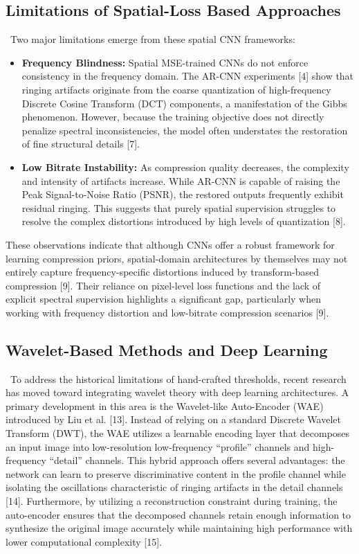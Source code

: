 \documentclass[12pt]{article}
\begin{document}
\subsection*{Limitations of Spatial-Loss Based Approaches}

\quad \, Two major limitations emerge from these spatial CNN frameworks:

\begin{itemize}
    \item \textbf{Frequency Blindness:} Spatial MSE-trained CNNs do not enforce consistency in the frequency domain. The AR-CNN experiments [4] show that ringing artifacts originate from the coarse quantization of high-frequency Discrete Cosine Transform (DCT) components, a manifestation of the Gibbs phenomenon. However, because the training objective does not directly penalize spectral inconsistencies, the model often understates the restoration of fine structural details [7].
    
    \item \textbf{Low Bitrate Instability:} As compression quality decreases, the complexity and intensity of artifacts increase. While AR-CNN is capable of raising the Peak Signal-to-Noise Ratio (PSNR), the restored outputs frequently exhibit residual ringing. This suggests that purely spatial supervision struggles to resolve the complex distortions introduced by high levels of quantization [8].
\end{itemize}

These observations indicate that although CNNs offer a robust framework for learning compression priors, spatial-domain architectures by themselves may not entirely capture frequency-specific distortions induced by transform-based compression [9]. Their reliance on pixel-level loss functions and the lack of explicit spectral supervision highlights a significant gap, particularly when working with frequency distortion and low-bitrate compression scenarios [9].

\subsection*{Wavelet-Based Methods and Deep Learning}


\quad \, To address the historical limitations of hand-crafted thresholds, recent research has moved toward integrating wavelet theory with deep learning architectures. A primary development in this area is the Wavelet-like Auto-Encoder (WAE) introduced by Liu et al. [13]. Instead of relying on a standard Discrete Wavelet Transform (DWT), the WAE utilizes a learnable encoding layer that decomposes an input image into low-resolution low-frequency ``profile'' channels and high-frequency ``detail'' channels. This hybrid approach offers several advantages: the network can learn to preserve discriminative content in the profile channel while isolating the oscillations characteristic of ringing artifacts in the detail channels [14]. Furthermore, by utilizing a reconstruction constraint during training, the auto-encoder ensures that the decomposed channels retain enough information to synthesize the original image accurately while maintaining high performance with lower computational complexity [15]. \\
\end{document}
